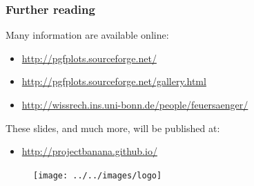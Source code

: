 \documentclass{beamer}
\begin{document}
\begin{frame}
\frametitle{Further reading}
Many information are available online:
\begin{itemize}
 \item \url{http://pgfplots.sourceforge.net/}
 \item \url{http://pgfplots.sourceforge.net/gallery.html}
 \item \small{\url{http://wissrech.ins.uni-bonn.de/people/feuersaenger/}}
\end{itemize}
These slides, and much more, will be published at:
\begin{itemize}
 \item \url{http://projectbanana.github.io/}
\end{itemize}
 \begin{figure}
\centering
 \texttt{[image: ../../images/logo]}
\end{figure}
\end{frame}
\end{document}
